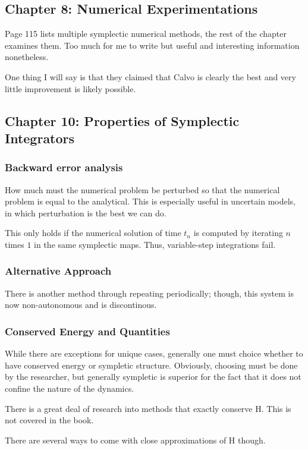 \subsection{Chapter 8: Numerical Experimentations}

Page 115 lists multiple symplectic numerical methods, the rest of the chapter examines them. Too much for me to write but useful and interesting
information nonetheless.

One thing I will say is that they claimed that Calvo is clearly the best and very little improvement is likely possible.

\subsection{Chapter 10: Properties of Symplectic Integrators}
\subsubsection{Backward error analysis}
How much must the numerical problem be perturbed so that the numerical problem is equal to the analytical.
This is especially useful in uncertain models, in which perturbation is the best we can do.

This only holds if the numerical solution of time $t_n$ is computed by iterating $n$ times $1$ in the same symplectic maps. Thus, variable-step integrations fail.

\subsubsection{Alternative Approach}
There is another method through repeating periodically; though, this system is now non-autonomous and is discontinous.

\subsubsection{Conserved Energy and Quantities}
While there are exceptions for unique cases, generally one must choice whether to have conserved energy or sympletic structure. Obviously, choosing must
be done by the researcher, but generally sympletic is superior for the fact that it does not confine the nature of the dynamics.

There is a great deal of research into methods that exactly conserve H. This is not covered in the book.

There are several ways to come with close approximations of H though.


